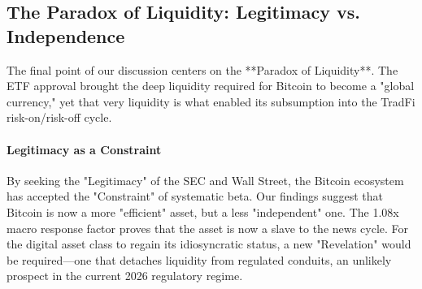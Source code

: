 \documentclass[10pt, conference, compsocconf]{IEEEtran}
\begin{document}

\subsection{The Paradox of Liquidity: Legitimacy vs. Independence}

The final point of our discussion centers on the **Paradox of Liquidity**. The ETF approval brought the deep liquidity required for Bitcoin to become a "global currency," yet that very liquidity is what enabled its subsumption into the TradFi risk-on/risk-off cycle.

\paragraph{Legitimacy as a Constraint}
By seeking the "Legitimacy" of the SEC and Wall Street, the Bitcoin ecosystem has accepted the "Constraint" of systematic beta. Our findings suggest that Bitcoin is now a more "efficient" asset, but a less "independent" one. The 1.08x macro response factor proves that the asset is now a slave to the news cycle. For the digital asset class to regain its idiosyncratic status, a new "Revelation" would be required—one that detaches liquidity from regulated conduits, an unlikely prospect in the current 2026 regulatory regime.

\end{document}
